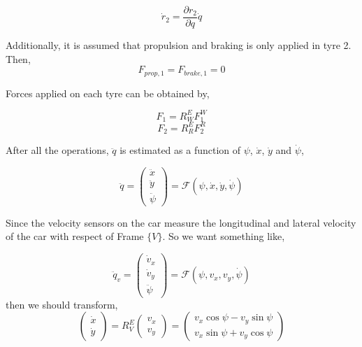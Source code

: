 \documentclass[12pt]{article}
\begin{document}
\begin{equation}
    \dot{r}_2 = \frac{\partial r_2}{\partial q} \dot{q}
\end{equation}

Additionally, it is assumed that propulsion and braking is only applied in tyre 2. Then,
\begin{equation}
    F_{prop,1} = F_{brake,1} = 0
\end{equation}

Forces applied on each tyre can be obtained by,

\begin{equation}
    F_1 = R^E_W F_1^W
\end{equation}
\begin{equation}
    F_2 = R^E_R F_2^R
\end{equation}

After all the operations, $\ddot{q}$ is estimated as a function of $\psi$, $\dot{x}$, $\dot{y}$ and $\dot{\psi}$,

\begin{equation}
    \ddot{q} = \begin{pmatrix} \ddot{x} \\ \ddot{y} \\ \ddot{\psi} \end{pmatrix} = \mathcal{F} (\psi,\dot{x},\dot{y},\dot{\psi})
\end{equation}

Since the velocity sensors on the car measure the longitudinal and lateral velocity of the car with respect of Frame $\{ V \}$. So we want something like,

\begin{equation}
    \ddot{q}_v = \begin{pmatrix} \dot{v}_x \\ \dot{v}_y \\ \ddot{\psi} \end{pmatrix} = \mathcal{F}(\psi,v_x,v_y,\dot{\psi})
\end{equation}
then we should transform,
\begin{equation} \label{eq_vel_rotation}
    \begin{pmatrix} \dot{x} \\ \dot{y} \end{pmatrix} = R^E_V \begin{pmatrix} v_x \\ v_y \end{pmatrix}  = \begin{pmatrix} v_x \cos{\psi} - v_y \sin{\psi} \\ v_x \sin{\psi} + v_y \cos{\psi}  \end{pmatrix}
\end{equation}
\end{document}
